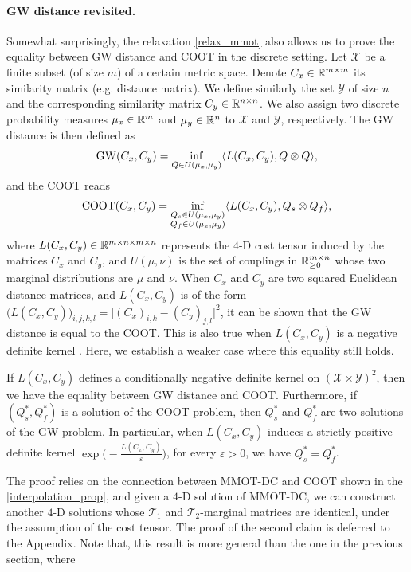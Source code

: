 \paragraph{GW distance revisited.} Somewhat surprisingly, the relaxation \ref{relax_mmot} also allows us to prove the equality
between GW distance and COOT in the discrete setting. Let $\mathcal X$ be a
finite subset (of size $m$) of a certain metric space. Denote $C_x \in \mathbb R^{m \times m}$ its similarity matrix (e.g. distance
matrix). We define similarly the set $\mathcal Y$ of size $n$ and the corresponding similarity matrix $C_y \in \mathbb R^{n \times n}$.
We also assign two discrete probability measures $\mu_x \in \mathbb R^m$ and $\mu_y \in \mathbb R^n$ to $\mathcal X$ and $\mathcal Y$,
respectively. The GW distance is then defined as
\begin{equation}
  \text{GW}(C_x, C_y) = \inf_{Q \in U(\mu_x, \mu_y)} \langle L(C_x, C_y), Q \otimes Q \rangle,
\end{equation}
and the COOT reads
\begin{equation}
  \text{COOT}(C_x, C_y) = \inf_{\substack{Q_s \in U(\mu_x, \mu_y) \\ Q_f \in U(\mu_x, \mu_y)}}
  \langle L(C_x, C_y), Q_s \otimes Q_f \rangle,
\end{equation}
where $L(C_x,C_y) \in \mathbb R^{m \times n \times m \times n}$ represents the $4$-D cost tensor induced by the matrices $C_x$ and $C_y$,
and $U(\mu, \nu)$ is the set of couplings in $\mathbb R^{m \times n}_{\geq 0}$ whose two marginal distributions are $\mu$ and
$\nu$. When $C_x$ and $C_y$ are two squared Euclidean distance matrices, and $L(C_x,C_y)$ is of the form
$\big(L(C_x,C_y)\big)_{i,j,k,l} = \vert (C_x)_{i,k} - (C_y)_{j,l} \vert^2$, it can be shown that the GW distance is equal
to the COOT. This is also true when $L(C_x, C_y)$ is a negative definite kernel \citep{Sejourne20}.
Here, we establish a weaker case where this equality still holds.
\begin{corollary} \label{kernel_gw_coot}
  If $L(C_x, C_y)$ defines a conditionally negative definite kernel on $(\mathcal X \times \mathcal Y)^2$, then we have the equality
  between GW distance and COOT. Furthermore, if $(Q_s^*,Q_f^*)$ is a solution of the COOT problem, then $Q_s^*$ and $Q_f^*$ are
  two solutions of the GW problem. In particular, when $L(C_x, C_y)$ induces a strictly positive definite kernel
  $\exp \big( -\frac{L(C_x, C_y)}{\varepsilon} \big)$, for every $\varepsilon > 0$, we have $Q_s^* = Q_f^*$.
\end{corollary}
The proof relies on the connection between MMOT-DC and COOT shown in the \cref{interpolation_prop},
and given a
$4$-D solution of MMOT-DC, we can construct another $4$-D solutions whose
$\mathcal T_1$ and $\mathcal T_2$-marginal matrices are identical,
under the assumption of the cost tensor. The proof of the second claim is deferred to the Appendix.
Note that, this result is more general than the one in the previous section, where

